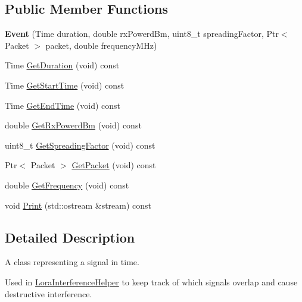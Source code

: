 \subsection*{Public Member Functions}
\begin{DoxyCompactItemize}
\item 
\mbox{\label{classns3_1_1lorawan_1_1LoraInterferenceHelper_1_1Event_a7ed9e05bda1c59057d65d046d4982f39}} 
{\bfseries Event} (Time duration, double rx\+Powerd\+Bm, uint8\+\_\+t spreading\+Factor, Ptr$<$ Packet $>$ packet, double frequency\+M\+Hz)
\item 
Time \hyperlink{classns3_1_1lorawan_1_1LoraInterferenceHelper_1_1Event_a1413175c6d325ae6e4131b3edc4df5aa}{Get\+Duration} (void) const
\item 
Time \hyperlink{classns3_1_1lorawan_1_1LoraInterferenceHelper_1_1Event_a0962fde4d6eca96401aea68a001d96fc}{Get\+Start\+Time} (void) const
\item 
Time \hyperlink{classns3_1_1lorawan_1_1LoraInterferenceHelper_1_1Event_a592178402fb4232513122ad3f9edcd0d}{Get\+End\+Time} (void) const
\item 
double \hyperlink{classns3_1_1lorawan_1_1LoraInterferenceHelper_1_1Event_a89d0371d6b9346699cad99be8d23e7aa}{Get\+Rx\+Powerd\+Bm} (void) const
\item 
uint8\+\_\+t \hyperlink{classns3_1_1lorawan_1_1LoraInterferenceHelper_1_1Event_af14d899b1e6f25dbe42b26824582085f}{Get\+Spreading\+Factor} (void) const
\item 
Ptr$<$ Packet $>$ \hyperlink{classns3_1_1lorawan_1_1LoraInterferenceHelper_1_1Event_ae1f0213b62e877c33ce3f37ca4f1f549}{Get\+Packet} (void) const
\item 
double \hyperlink{classns3_1_1lorawan_1_1LoraInterferenceHelper_1_1Event_a4dac36c337c87310c5820cc6571d9b5a}{Get\+Frequency} (void) const
\item 
void \hyperlink{classns3_1_1lorawan_1_1LoraInterferenceHelper_1_1Event_aa3a3f59131390caee329736d91748c93}{Print} (std\+::ostream \&stream) const
\end{DoxyCompactItemize}


\subsection{Detailed Description}
A class representing a signal in time.

Used in \hyperlink{classns3_1_1lorawan_1_1LoraInterferenceHelper}{Lora\+Interference\+Helper} to keep track of which signals overlap and cause destructive interference. 

